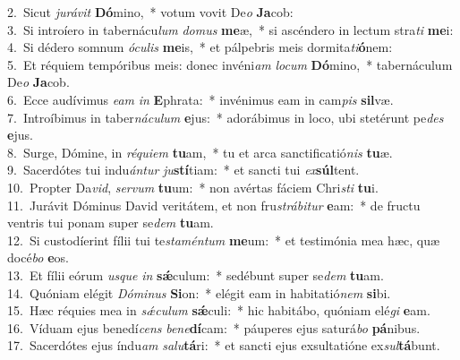 {2.~}Sicut \textit{ju}\textit{rá}\textit{vit} \textbf{Dó}mino,~* votum vovit De\textit{o} \textbf{Ja}cob:\\
{3.~}Si introíero in tabernácu\textit{lum} \textit{do}\textit{mus} \textbf{me}æ,~* si ascéndero in lectum stra\textit{ti} \textbf{me}i:\\
{4.~}Si dédero somnum \textit{ó}\textit{cu}\textit{lis} \textbf{me}is,~* et pálpebris meis dormita\textit{ti}\textbf{ó}nem:\\
{5.~}Et réquiem tempóribus meis: donec invéni\textit{am} \textit{lo}\textit{cum} \textbf{Dó}mino,~* tabernáculum De\textit{o} \textbf{Ja}cob.\\
{6.~}Ecce audívimus \textit{e}\textit{am} \textit{in} \textbf{E}phrata:~* invénimus eam in cam\textit{pis} \textbf{sil}væ.\\
{7.~}Introíbimus in taber\textit{ná}\textit{cu}\textit{lum} \textbf{e}jus:~* adorábimus in loco, ubi stetérunt pe\textit{des} \textbf{e}jus.\\
{8.~}Surge, Dómine, in \textit{ré}\textit{qui}\textit{em} \textbf{tu}am,~* tu et arca sanctificatió\textit{nis} \textbf{tu}æ.\\
{9.~}Sacerdótes tui indu\textit{án}\textit{tur} \textit{ju}\textbf{stí}tiam:~* et sancti tui \textit{ex}\textbf{súl}tent.\\
{10.~}Propter Da\textit{vid}, \textit{ser}\textit{vum} \textbf{tu}um:~* non avértas fáciem Chri\textit{sti} \textbf{tu}i.\\
{11.~}Jurávit Dóminus David veritátem, et non fru\textit{strá}\textit{bi}\textit{tur} \textbf{e}am:~* de fructu ventris tui ponam super se\textit{dem} \textbf{tu}am.\\
{12.~}Si custodíerint fílii tui te\textit{sta}\textit{mén}\textit{tum} \textbf{me}um:~* et testimónia mea hæc, quæ docé\textit{bo} \textbf{e}os.\\
{13.~}Et fílii eórum \textit{us}\textit{que} \textit{in} \textbf{sǽ}culum:~* sedébunt super se\textit{dem} \textbf{tu}am.\\
{14.~}Quóniam elégit \textit{Dó}\textit{mi}\textit{nus} \textbf{Si}on:~* elégit eam in habitatió\textit{nem} \textbf{si}bi.\\
{15.~}Hæc réquies mea in \textit{sǽ}\textit{cu}\textit{lum} \textbf{sǽ}culi:~* hic habitábo, quóniam elé\textit{gi} \textbf{e}am.\\
{16.~}Víduam ejus benedí\textit{cens} \textit{be}\textit{ne}\textbf{dí}cam:~* páuperes ejus saturá\textit{bo} \textbf{pá}nibus.\\
{17.~}Sacerdótes ejus índu\textit{am} \textit{sa}\textit{lu}\textbf{tá}ri:~* et sancti ejus exsultatióne ex\textit{sul}\textbf{tá}bunt.\\

